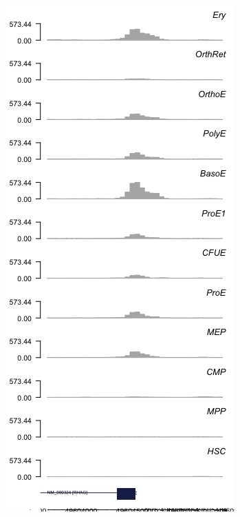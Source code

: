 \begin{figure}
  \begin{subfigure}[b]{0.5\linewidth}
      \centering
      \includegraphics[width=\textwidth]{plot/ch4/RHAG}

\end{subfigure}
\end{figure}
